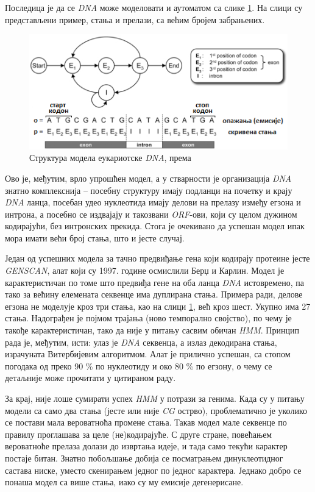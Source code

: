 \documentclass[12pt,oneside]{memoir}
\begin{document}
\begin{CJK}{UTF8}{ipxm}
Последица је да се \textit{DNA} може моделовати и аутоматом са слике \ref{fig:eukariote}. На слици су представљени пример, стања и прелази, са већим бројем забрањених.

\begin{figure}[H]
  \centering
  \includegraphics[width=.85\textwidth]{eukariote.png}
  \caption{Структура модела еукариотске \textit{DNA}, према \cite{eukary}}
  \label{fig:eukariote}
\end{figure}

Ово је, међутим, врло упрошћен модел, а у стварности је организација \textit{DNA} знатно комплекснија -- посебну структуру имају подланци на почетку и крају \textit{DNA} ланца, посебан удео нуклеотида имају делови на прелазу између егзона и интрона, а посебно се издвајају и такозвани \textit{ORF}-ови, који су целом дужином кодирајући, без интронских прекида\cite{henderson1997, huson2020}. Стога је очекивано да успешан модел ипак мора имати већи број стања, што и јесте случај.

Један од успешних модела за тачно предвиђање гена који кодирају протеине јесте \textit{GENSCAN}, алат који су 1997. године осмислили Берџ и Карлин\cite{genscan, burge1997}. Модел је карактеристичан по томе што предвиђа гене на оба ланца \textit{DNA} истовремено, па тако за већину елемената секвенце има дуплирана стања. Примера ради, делове егзона не моделује кроз три стања, као на слици \ref{fig:eukariote}, већ кроз шест. Укупно има 27 стања. Надограђен је појмом трајања (ново темпорално својство), по чему је такође карактеристичан, тако да није у питању сасвим обичан \textit{HMM}. Принцип рада је, међутим, исти: улаз је \textit{DNA} секвенца, а излаз декодирана стања, израчуната Витербијевим алгоритмом. Алат је прилично успешан, са стопом погодака од преко 90 \% по нуклеотиду и око 80 \% по егзону, о чему се детаљније може прочитати у цитираном раду.

За крај, није лоше сумирати успех \textit{HMM} у потрази за генима. Када су у питању модели са само два стања (јесте или није \textit{CG} острво), проблематично је уколико се постави мала вероватноћа промене стања. Такав модел мале секвенце по правилу проглашава за целе (не)кодирајуће. С друге стране, повећањем вероватноће прелаза долази до извртања идеје, и тада само текући карактер постаје битан. Знатно побољшање добија се посматрањем динуклеотидног састава ниске, уместо скенирањем једног по једног карактера. Једнако добро се понаша модел са више стања, иако су му емисије дегенерисане.


\end{CJK}
\end{document}
